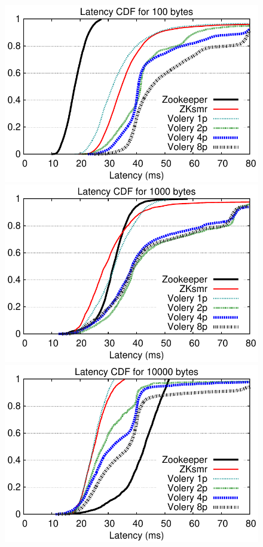 \begin{figure}

\begin{minipage}[b]{0.3333\linewidth} %
\centering
      \includegraphics[width=0.9\columnwidth]{graphs/results/zk_disk/plot_latency_cdfs_100bytes}
\end{minipage}
\begin{minipage}[b]{0.3333\linewidth}
\centering
      \includegraphics[width=0.9\columnwidth]{graphs/results/zk_disk/plot_latency_cdfs_1000bytes}
\end{minipage}
\begin{minipage}[b]{0.3333\linewidth}
\centering
      \includegraphics[width=0.9\columnwidth]{graphs/results/zk_disk/plot_latency_cdfs_10000bytes}

\end{minipage}
\end{figure}

